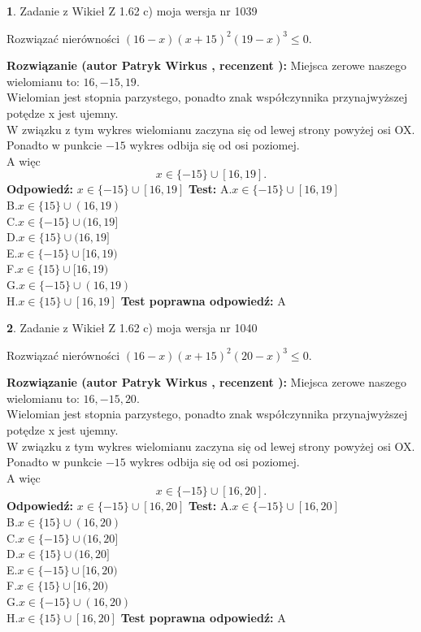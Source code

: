 \documentclass[12pt, a4paper]{article}
\theoremstyle{definition} %
\newtheorem{zad}{}
\newcommand{\zadStart}[1]{\begin{zad}#1\newline}
\newcommand{\zadStop}{\end{zad}}
\newcommand{\rozwStart}[2]{\noindent \textbf{Rozwiązanie (autor #1 , recenzent #2): }\newline}
\newcommand{\rozwStop}{\newline}
\newcommand{\odpStart}{\noindent \textbf{Odpowiedź:}\newline}
\newcommand{\odpStop}{\newline}
\newcommand{\testStart}{\noindent \textbf{Test:}\newline}
\newcommand{\testStop}{\newline}
\newcommand{\kluczStart}{\noindent \textbf{Test poprawna odpowiedź:}\newline}
\newcommand{\kluczStop}{\newline}
\begin{document}
\zadStart{Zadanie z Wikieł Z 1.62 c) moja wersja nr 1039}

Rozwiązać nierówności $(16-x)(x+15)^{2}(19-x)^{3}\le0$.
\zadStop
\rozwStart{Patryk Wirkus}{}
Miejsca zerowe naszego wielomianu to: $16, -15, 19$.\\
Wielomian jest stopnia parzystego, ponadto znak współczynnika przy\linebreak najwyższej potędze x jest ujemny.\\ W związku z tym wykres wielomianu zaczyna się od lewej strony powyżej osi OX.\\
Ponadto w punkcie $-15$ wykres odbija się od osi poziomej.\\
A więc $$x \in \{-15\} \cup [16,19].$$
\rozwStop
\odpStart
$x \in \{-15\} \cup [16,19]$
\odpStop
\testStart
A.$x \in \{-15\} \cup [16,19]$\\
B.$x \in \{15\} \cup (16,19)$\\
C.$x \in \{-15\} \cup (16,19]$\\
D.$x \in \{15\} \cup (16,19]$\\
E.$x \in \{-15\} \cup [16,19)$\\
F.$x \in \{15\} \cup [16,19)$\\
G.$x \in \{-15\} \cup (16,19)$\\
H.$x \in \{15\} \cup [16,19]$
\testStop
\kluczStart
A
\kluczStop



\zadStart{Zadanie z Wikieł Z 1.62 c) moja wersja nr 1040}

Rozwiązać nierówności $(16-x)(x+15)^{2}(20-x)^{3}\le0$.
\zadStop
\rozwStart{Patryk Wirkus}{}
Miejsca zerowe naszego wielomianu to: $16, -15, 20$.\\
Wielomian jest stopnia parzystego, ponadto znak współczynnika przy\linebreak najwyższej potędze x jest ujemny.\\ W związku z tym wykres wielomianu zaczyna się od lewej strony powyżej osi OX.\\
Ponadto w punkcie $-15$ wykres odbija się od osi poziomej.\\
A więc $$x \in \{-15\} \cup [16,20].$$
\rozwStop
\odpStart
$x \in \{-15\} \cup [16,20]$
\odpStop
\testStart
A.$x \in \{-15\} \cup [16,20]$\\
B.$x \in \{15\} \cup (16,20)$\\
C.$x \in \{-15\} \cup (16,20]$\\
D.$x \in \{15\} \cup (16,20]$\\
E.$x \in \{-15\} \cup [16,20)$\\
F.$x \in \{15\} \cup [16,20)$\\
G.$x \in \{-15\} \cup (16,20)$\\
H.$x \in \{15\} \cup [16,20]$
\testStop
\kluczStart
A
\kluczStop
\end{document}
